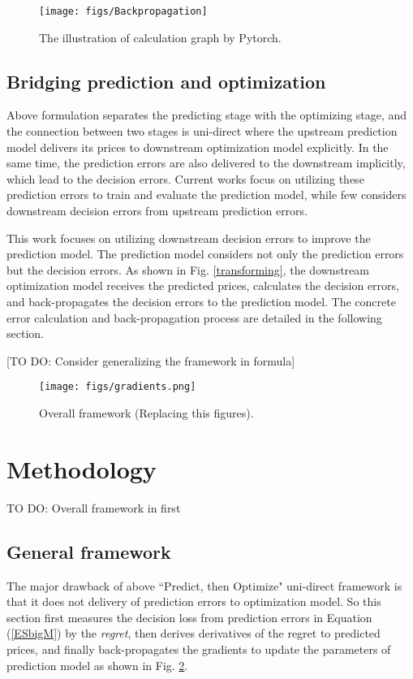\documentclass[journal]{IEEEtran}
\newcommand{\slw}{\color{blue}}
\begin{document}
{\slw{Explain the back-propagation procedures preliminaries}}

\begin{figure}[ht]
  \centering
  \texttt{[image: figs/Backpropagation]}
  \caption{The illustration of calculation graph by Pytorch.}
  \label{Backpropagation}
\end{figure}


\subsection{Bridging prediction and optimization}
Above formulation separates the predicting stage with the optimizing stage, and the connection between two stages is uni-direct where the upstream prediction model delivers its prices to downstream optimization model explicitly. In the same time, the prediction errors are also delivered to the downstream implicitly, which lead to the decision errors. Current works \cite{Shi2021,Chang2019,Qiao2020,Gonzalez2018,Diaz2019} focus on utilizing these prediction errors to train and evaluate the prediction model, while few considers downstream decision errors from upstream prediction errors. 

This work focuses on utilizing downstream decision errors to improve the prediction model. The prediction model considers not only the prediction errors but the decision errors. As shown in Fig. \ref{transforming}, the downstream optimization model receives the predicted prices, calculates the decision errors, and back-propagates the decision errors to the prediction model. The concrete error calculation and back-propagation process are detailed in the following section.

{\slw [TO DO: Consider generalizing the framework in formula]}

\begin{figure}[ht]
  \centering
  \texttt{[image: figs/gradients.png]}
  \caption{Overall framework (Replacing this figures).}
  \label{SPO}
\end{figure}

\section{Methodology}
{\slw TO DO: Overall framework in first}

\subsection{General framework}
The major drawback of above ``Predict, then Optimize" uni-direct framework is that it does not delivery of prediction errors to optimization model. So this section first measures the decision loss from prediction errors in Equation (\ref{ESbigM}) by the \textit{regret}, then derives derivatives of the regret to predicted prices, and finally back-propagates the gradients to update the parameters of prediction model as shown in Fig. \ref{SPO}.
\end{document}
